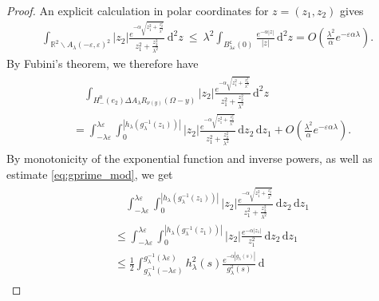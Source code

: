 \documentclass[11pt]{article}
\numberwithin{statement}{section}
\numberwithin{equation}{section}
\theoremstyle{remark}
\newcommand{\R}{\mathbb R} 				%
\newcommand{\intd}{\, \mathrm{d}} 				%
\newcommand{\stcomp}[1]{{#1}^{\mathsf{c}}}		%
\newcommand{\eps}{\varepsilon}
\begin{document}
\begin{proof}
	An explicit calculation in polar coordinates for
          $z = (z_1, z_2)$ gives
	\begin{align}
          \int_{ \R^2 \backslash A_\lambda (-\eps,\eps)^2 }
          \left| z_2  \right| \frac{e^{-\alpha \sqrt{z_1^2 +
          \frac{z_2^2}{\lambda^2} }}}{z_1^2 + \frac{z_2^2}{\lambda^2}}
          \intd^2 z \ \leq \ \lambda^2
          \int_{\stcomp{B}_{\lambda \eps}(0)} \frac{e^{-\alpha
          |z|}}{|z|} \intd^2 z = O\left(\frac{\lambda^2}{\alpha} e^{-
          \eps \alpha \lambda}\right). 
	\end{align}
	By Fubini's theorem, we therefore have
	\begin{align}\label{eq:terror_term_1}
	  \begin{split}
            &\quad \int_{ H^0_-(e_2) \Delta A_\lambda R_{\nu(y)} 
              (\Omega - y) } \left| z_2 \right| \frac{e^{-\alpha
                \sqrt{z_1^2 + \frac{z_2^2}{\lambda^2} }}}{z_1^2 +
              \frac{z_2^2}{\lambda^2}} \intd^2 z \\
		& = \int_{-\lambda \eps}^{\lambda \eps}
                \int_0^{\left| h_\lambda(g_\lambda^{-1}(z_1))\right|} \left| z_2
                \right| \frac{e^{-\alpha \sqrt{z_1^2 +
                      \frac{z_2^2}{\lambda^2} }}}{z_1^2 +
                  \frac{z_2^2}{\lambda^2}} \intd z_2 \intd z_1 +
                O\left(\frac{\lambda^2}{\alpha} e^{- \eps \alpha
                    \lambda}\right).
	  \end{split}
	\end{align}
	By monotonicity of the exponential function and inverse powers, as well as estimate \eqref{eq:gprime_mod}, we get
	\begin{align}\label{eq:terror_term_2}
	  \begin{split}	
            & \quad \int_{-\lambda \eps}^{\lambda \eps}
            \int_0^{\left|h_\lambda(g_\lambda^{-1}(z_1))\right|}
            \left| z_2 \right| \frac{e^{-\alpha \sqrt{z_1^2 +
                  \frac{z_2^2}{\lambda^2} }}}{z_1^2 +
              \frac{z_2^2}{\lambda^2}} \intd z_2 \intd z_1\\
            &  \leq \int_{-\lambda \eps }^{\lambda \eps}
            \int_0^{\left|h_\lambda(g_\lambda^{-1}(z_1))\right|}
            \left| z_2  \right| \frac{e^{-\alpha |z_1|}}{z_1^2 } \intd
            z_2  \intd z_1 \\ 
            & \leq \frac{1 }{2} \int_{g_\lambda^{-1}(-\lambda \eps)
            }^{g_\lambda^{-1}(\lambda \eps)} h^2_\lambda(s)
            \frac{e^{-\alpha |g_\lambda(s)|} }{g^2_\lambda(s) } \intd

\end{split}
\end{align}
\end{proof}
\end{document}
